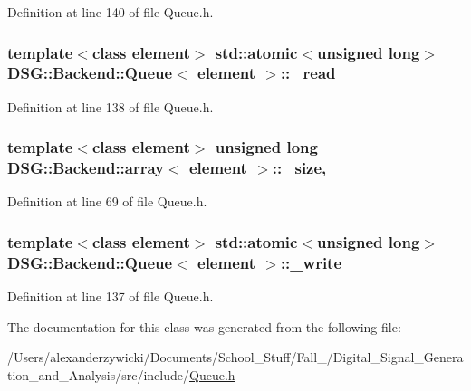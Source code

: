 Definition at line 140 of file Queue.\+h.

\hypertarget{classDSG_1_1Backend_1_1Queue_a10510513da0290a435fe47079287cf29}{
\subsubsection[{\+\_\+read}]{\setlength{\rightskip}{0pt plus 5cm}template$<$class element$>$ std\+::atomic$<$unsigned long$>$ {\bf D\+S\+G\+::\+Backend\+::\+Queue}$<$ element $>$\+::\+\_\+read\hspace{0.3cm}{\ttfamily [protected]}}}\label{classDSG_1_1Backend_1_1Queue_a10510513da0290a435fe47079287cf29}


Definition at line 138 of file Queue.\+h.

\hypertarget{classDSG_1_1Backend_1_1array_a44349f32c09ebb31d5eadbe9a222cba2}{
\subsubsection[{\+\_\+size}]{\setlength{\rightskip}{0pt plus 5cm}template$<$class element$>$ unsigned long {\bf D\+S\+G\+::\+Backend\+::array}$<$ element $>$\+::\+\_\+size\hspace{0.3cm}{\ttfamily [protected]}, {\ttfamily [inherited]}}}\label{classDSG_1_1Backend_1_1array_a44349f32c09ebb31d5eadbe9a222cba2}


Definition at line 69 of file Queue.\+h.

\hypertarget{classDSG_1_1Backend_1_1Queue_adbbe7e332752d500e7b9fadeb08cac54}{
\subsubsection[{\+\_\+write}]{\setlength{\rightskip}{0pt plus 5cm}template$<$class element$>$ std\+::atomic$<$unsigned long$>$ {\bf D\+S\+G\+::\+Backend\+::\+Queue}$<$ element $>$\+::\+\_\+write\hspace{0.3cm}{\ttfamily [protected]}}}\label{classDSG_1_1Backend_1_1Queue_adbbe7e332752d500e7b9fadeb08cac54}


Definition at line 137 of file Queue.\+h.



The documentation for this class was generated from the following file\+:\begin{DoxyCompactItemize}
\item 
/\+Users/alexanderzywicki/\+Documents/\+School\+\_\+\+Stuff/\+Fall\+\_/\+Digital\+\_\+\+Signal\+\_\+\+Generation\+\_\+and\+\_\+\+Analysis/src/include/\hyperlink{Queue_8h}{Queue.\+h}\end{DoxyCompactItemize}
